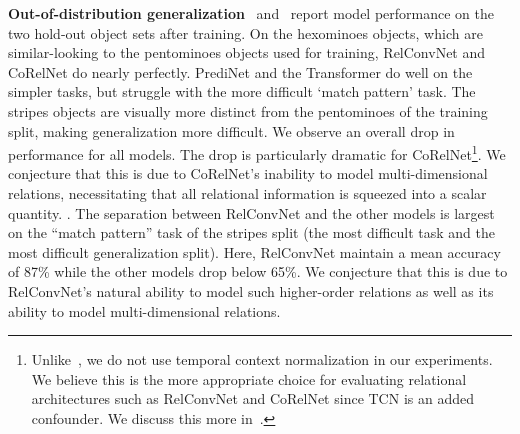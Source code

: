\textbf{Out-of-distribution generalization}~ and~ report model performance on the two hold-out object sets after training. On the hexominoes objects, which are similar-looking to the pentominoes objects used for training, RelConvNet and CoRelNet do nearly perfectly. PrediNet and the Transformer do well on the simpler tasks, but struggle with the more difficult `match pattern' task. The stripes objects are visually more distinct from the pentominoes of the training split, making generalization more difficult. We observe an overall drop in performance for all models. The drop is particularly dramatic for CoRelNet\footnote{Unlike~\citep{kergNeuralArchitecture2022}, we do not use temporal context normalization in our experiments. We believe this is the more appropriate choice for evaluating relational architectures such as RelConvNet and CoRelNet since TCN is an added confounder. We discuss this more in~.}. We conjecture that this is due to CoRelNet's inability to model multi-dimensional relations, necessitating that all relational information is squeezed into a scalar quantity. . The separation between RelConvNet and the other models is largest on the ``match pattern'' task of the stripes split (the most difficult task and the most difficult generalization split). Here, RelConvNet maintain a mean accuracy of 87\% while the other models drop below 65\%. We conjecture that this is due to RelConvNet's natural ability to model such higher-order relations as well as its ability to model multi-dimensional relations.
